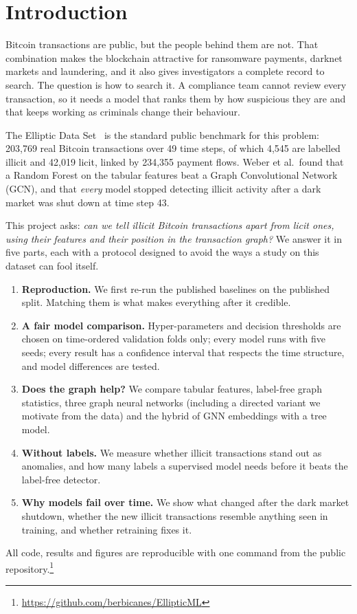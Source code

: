 \section{Introduction}

Bitcoin transactions are public, but the people behind them are not. That
combination makes the blockchain attractive for ransomware payments, darknet
markets and laundering, and it also gives investigators a complete record to
search. The question is how to search it. A compliance team cannot review
every transaction, so it needs a model that ranks them by how suspicious they
are and that keeps working as criminals change their behaviour.

The Elliptic Data Set~\cite{weber2019} is the standard public benchmark for
this problem: 203,769 real Bitcoin transactions over 49 time steps, of which
4,545 are labelled illicit and 42,019 licit, linked by 234,355 payment flows.
Weber et al.\ found that a Random Forest on the tabular features beat a Graph
Convolutional Network (GCN), and that \emph{every} model stopped detecting
illicit activity after a dark market was shut down at time step 43.

This project asks: \emph{can we tell illicit Bitcoin transactions apart from
licit ones, using their features and their position in the transaction graph?}
We answer it in five parts, each with a protocol designed to avoid the ways a
study on this dataset can fool itself.

\begin{enumerate}
  \item \textbf{Reproduction.} We first re-run the published baselines on the
        published split. Matching them is what makes everything after it credible.
  \item \textbf{A fair model comparison.} Hyper-parameters and decision
        thresholds are chosen on time-ordered validation folds only; every model
        runs with five seeds; every result has a confidence interval that
        respects the time structure, and model differences are tested.
  \item \textbf{Does the graph help?} We compare tabular features, label-free
        graph statistics, three graph neural networks (including a directed
        variant we motivate from the data) and the hybrid of GNN embeddings
        with a tree model.
  \item \textbf{Without labels.} We measure whether illicit transactions stand
        out as anomalies, and how many labels a supervised model needs before it
        beats the label-free detector.
  \item \textbf{Why models fail over time.} We show what changed after the dark
        market shutdown, whether the new illicit transactions resemble anything
        seen in training, and whether retraining fixes it.
\end{enumerate}

All code, results and figures are reproducible with one command from the
public repository.\footnote{\url{https://github.com/berbicanes/EllipticML}}
